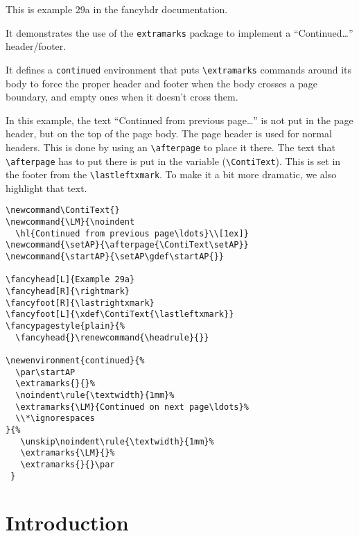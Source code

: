 \documentclass{report}
\newcommand\ContiText{}
\newcommand{\LM}{\noindent\hl{Continued from previous page\ldots}\\[1ex]}
\newcommand{\setAP}{\afterpage{\ContiText\setAP}}
\newcommand{\startAP}{\setAP\gdef\startAP{}}
\begin{document}
\tableofcontents

\thispagestyle{plain}
\noindent
\begin{boxedminipage}{\textwidth}
\small
This is example 29a in the fancyhdr documentation.

It demonstrates the use of the \texttt{extramarks} package to implement
a ``Continued\ldots'' header/footer.

It defines a \texttt{continued} environment that puts \verb|\extramarks|
commands around its body to force the proper header and footer when the
body crosses a page boundary, and empty ones when it doesn't cross them.

In this example, the text ``Continued from previous
page\ldots'' is not put in the page header, but on the top of the page
body. The page header is used for normal headers. This is done by using
an \verb|\afterpage| to place it there. The text that \verb|\afterpage|
has to put there is put in the variable (\verb|\ContiText|). This is set
in the footer from the \verb|\lastleftxmark|. To make it a bit more
dramatic, we also highlight that text.

\begin{verbatim}
\newcommand\ContiText{}
\newcommand{\LM}{\noindent
  \hl{Continued from previous page\ldots}\\[1ex]}
\newcommand{\setAP}{\afterpage{\ContiText\setAP}}
\newcommand{\startAP}{\setAP\gdef\startAP{}}

\fancyhead[L]{Example 29a}
\fancyhead[R]{\rightmark}
\fancyfoot[R]{\lastrightxmark}
\fancyfoot[L]{\xdef\ContiText{\lastleftxmark}}
\fancypagestyle{plain}{%
  \fancyhead{}\renewcommand{\headrule}{}}

\newenvironment{continued}{%
  \par\startAP
  \extramarks{}{}%
  \noindent\rule{\textwidth}{1mm}%
  \extramarks{\LM}{Continued on next page\ldots}%
  \\*\ignorespaces
}{%
   \unskip\noindent\rule{\textwidth}{1mm}%
   \extramarks{\LM}{}%
   \extramarks{}{}\par
 }
\end{verbatim}

\end{boxedminipage}

\pagestyle{fancy}

\newpage
{}
\chapter{Introduction}
\end{document}

